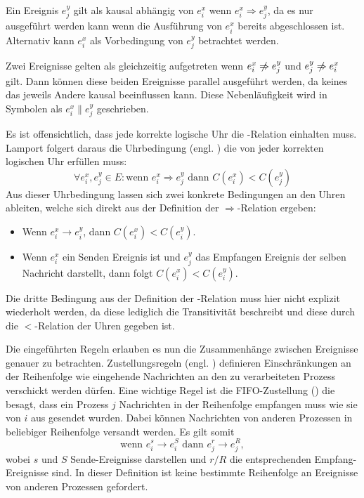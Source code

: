 Ein Ereignis $e_j^y$ gilt als kausal abhängig von $e_i^x$ wenn $e_i^x \Rightarrow e_j^y$, da es nur ausgeführt werden kann wenn die Ausführung von $e_i^x$ bereits abgeschlossen ist.
Alternativ kann $e_i^x$ als Vorbedingung von $e_j^y$ betrachtet werden.

Zwei Ereignisse gelten als gleichzeitig aufgetreten wenn $e_i^x \centernot\Rightarrow e_j^y$ und $e_j^y \centernot\Rightarrow e_i^x$ gilt.
Dann können diese beiden Ereignisse parallel ausgeführt werden, da keines das jeweils Andere kausal beeinflussen kann.
Diese Nebenläufigkeit wird in Symbolen als $e_i^x \parallel e_j^y$ geschrieben.

Es ist offensichtlich, dass jede korrekte logische Uhr die -Relation einhalten muss.
Lamport folgert daraus die Uhrbedingung (engl. ) die von jeder korrekten logischen Uhr erfüllen muss:
\begin{equation*}
\forall e_i^x, e_j^y \in E \colon \text{wenn } e_i^x \Rightarrow e_j^y \text{ dann } C(e_i^x) < C(e_j^y)
\end{equation*}
Aus dieser Uhrbedingung lassen sich zwei konkrete Bedingungen an den Uhren ableiten, welche sich direkt aus der Definition der $\Rightarrow$-Relation ergeben:
\begin{itemize}
    \item Wenn $e_i^x \rightarrow e_i^y$, dann $C(e_i^x) < C(e_i^y)$.
    \item Wenn $e_i^x$ ein Senden Ereignis ist und $e_j^y$ das Empfangen Ereignis der selben Nachricht darstellt, dann folgt $C(e_i^x) < C(e_i^y)$.
\end{itemize}

Die dritte Bedingung aus der Definition der -Relation muss hier nicht explizit wiederholt werden, da diese lediglich die Transitivität beschreibt und diese durch die $<$-Relation der Uhren gegeben ist.

Die eingeführten Regeln erlauben es nun die Zusammenhänge zwischen Ereignisse genauer zu betrachten.
Zustellungsregeln (engl. ) definieren Einschränkungen an der Reihenfolge wie eingehende Nachrichten an den zu verarbeiteten Prozess verschickt werden dürfen.
Eine wichtige Regel ist die FIFO-Zustellung () die besagt, dass ein Prozess $j$ Nachrichten in der Reihenfolge empfangen muss wie sie von $i$ aus gesendet wurden.
Dabei können Nachrichten von anderen Prozessen in beliebiger Reihenfolge versandt werden.
Es gilt somit
\begin{equation*}
    \text{wenn } e_i^s \rightarrow e_i^S \text{ dann } e_j^r \rightarrow e_j^R,
\end{equation*}
wobei $s$ und $S$ Sende-Ereignisse darstellen und $r/R$ die entsprechenden Empfang-Ereignisse sind.
In dieser Definition ist keine bestimmte Reihenfolge an Ereignisse von anderen Prozessen gefordert.

